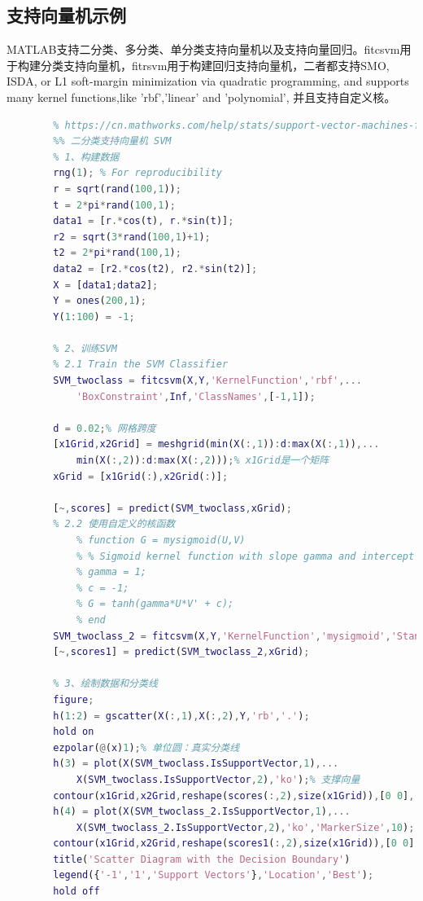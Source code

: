     \subsection{支持向量机示例}
        \par
        MATLAB支持二分类、多分类、单分类支持向量机以及支持向量回归。fitcsvm用于构建分类支持向量机，fitrsvm用于构建回归支持向量机，二者都支持SMO, ISDA, or L1 soft-margin minimization via quadratic programming, and supports many kernel functions,like 'rbf','linear' and 'polynomial', 并且支持自定义核。
        \begin{lstlisting}[language=Matlab]
        %% 参考
        % https://cn.mathworks.com/help/stats/support-vector-machines-for-binary-classification.html
        %% 二分类支持向量机 SVM
        % 1、构建数据
        rng(1); % For reproducibility
        r = sqrt(rand(100,1));
        t = 2*pi*rand(100,1);
        data1 = [r.*cos(t), r.*sin(t)];
        r2 = sqrt(3*rand(100,1)+1);
        t2 = 2*pi*rand(100,1);
        data2 = [r2.*cos(t2), r2.*sin(t2)];
        X = [data1;data2];
        Y = ones(200,1);
        Y(1:100) = -1;

        % 2、训练SVM
        % 2.1 Train the SVM Classifier
        SVM_twoclass = fitcsvm(X,Y,'KernelFunction','rbf',...
            'BoxConstraint',Inf,'ClassNames',[-1,1]);

        d = 0.02;% 网格跨度
        [x1Grid,x2Grid] = meshgrid(min(X(:,1)):d:max(X(:,1)),...
            min(X(:,2)):d:max(X(:,2)));% x1Grid是一个矩阵
        xGrid = [x1Grid(:),x2Grid(:)];

        [~,scores] = predict(SVM_twoclass,xGrid);
        % 2.2 使用自定义的核函数
            % function G = mysigmoid(U,V)
            % % Sigmoid kernel function with slope gamma and intercept c
            % gamma = 1;
            % c = -1;
            % G = tanh(gamma*U*V' + c);
            % end
        SVM_twoclass_2 = fitcsvm(X,Y,'KernelFunction','mysigmoid','Standardize',true);
        [~,scores1] = predict(SVM_twoclass_2,xGrid);

        % 3、绘制数据和分类线
        figure;
        h(1:2) = gscatter(X(:,1),X(:,2),Y,'rb','.');
        hold on
        ezpolar(@(x)1);% 单位圆：真实分类线
        h(3) = plot(X(SVM_twoclass.IsSupportVector,1),...
            X(SVM_twoclass.IsSupportVector,2),'ko');% 支撑向量
        contour(x1Grid,x2Grid,reshape(scores(:,2),size(x1Grid)),[0 0],':k');% 分类线
        h(4) = plot(X(SVM_twoclass_2.IsSupportVector,1),...
            X(SVM_twoclass_2.IsSupportVector,2),'ko','MarkerSize',10);
        contour(x1Grid,x2Grid,reshape(scores1(:,2),size(x1Grid)),[0 0],'--r');
        title('Scatter Diagram with the Decision Boundary')
        legend({'-1','1','Support Vectors'},'Location','Best');
        hold off


\end{lstlisting}
